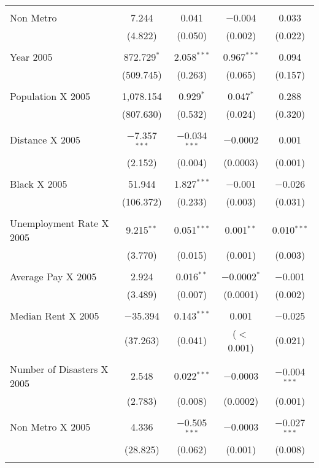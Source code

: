 \documentclass[]{article}
\begin{document}
\begin{table}[!htbp]
\begin{tabular}{@{\extracolsep{5pt}}lcccc}
  & & & & \\ 
 Non Metro & 7.244 & 0.041 & $-$0.004& 0.033 \\ 
  & (4.822) & (0.050) & (0.002) & (0.022) \\ 
  & & & & \\ 
 Year 2005 & 872.729$^{*}$ & 2.058$^{***}$ & 0.967$^{***}$ & 0.094 \\ 
  & (509.745) & (0.263) & (0.065) & (0.157) \\ 
  & & & & \\ 
 Population X 2005 & 1,078.154 & 0.929$^{*}$ & 0.047$^{*}$ & 0.288 \\ 
  & (807.630) & (0.532) & (0.024) & (0.320) \\ 
  & & & & \\ 
 Distance X 2005 & $-$7.357$^{***}$ & $-$0.034$^{***}$ & $-$0.0002& 0.001 \\ 
  & (2.152) & (0.004) & (0.0003) & (0.001) \\ 
  & & & & \\ 
 Black X 2005 & 51.944 & 1.827$^{***}$ & $-$0.001 & $-$0.026 \\ 
  & (106.372) & (0.233) & (0.003) & (0.031) \\ 
  & & & & \\ 
 Unemployment Rate X 2005  & 9.215$^{**}$ & 0.051$^{***}$ & 0.001$^{**}$ & 0.010$^{***}$ \\ 
  & (3.770) & (0.015) & (0.001) & (0.003) \\ 
  & & & & \\ 
 Average Pay X 2005 & 2.924 & 0.016$^{**}$ & $-$0.0002$^{*}$ & $-$0.001 \\ 
  & (3.489) & (0.007) & (0.0001) & (0.002) \\ 
  & & & & \\ 
 Median Rent X 2005 & $-$35.394 & 0.143$^{***}$ & 0.001& $-$0.025 \\ 
  & (37.263) & (0.041) & ($<$0.001) & (0.021) \\ 
  & & & & \\ 
 Number of Disasters X 2005 & 2.548 & 0.022$^{***}$ & $-$0.0003 & $-$0.004$^{***}$ \\ 
  & (2.783) & (0.008) & (0.0002) & (0.001) \\ 
  & & & & \\ 
 Non Metro X 2005 & 4.336 & $-$0.505$^{***}$ & $-$0.0003 & $-$0.027$^{***}$ \\ 
  & (28.825) & (0.062) & (0.001) & (0.008) \\ 
  & & & & \\ 

\end{tabular}
\end{table}
\end{document}
